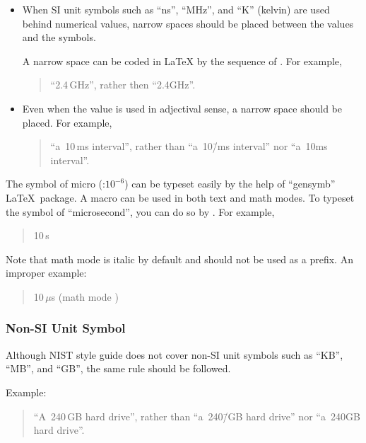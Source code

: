 \begin{itemize}
\item When SI unit symbols such as ``ns'', ``MHz'', and ``K'' (kelvin)
are used behind numerical values, narrow spaces should be placed between
the values and the symbols.

A narrow space can be coded in \LaTeX{} by the sequence of \qco{\\,}.
For example,
\begin{quote}
  ``2.4\,GHz'', rather then ``2.4GHz''.
\end{quote}

\item Even when the value is used in adjectival sense, a narrow space
  should be placed.
  For example,
\begin{quote}
  ``a~10\,ms interval'', rather than ``a~10\=/ms interval'' nor
  ``a~10ms interval''.
\end{quote}
\end{itemize}

The symbol of micro (\micro :$10^{-6}$) can be typeset easily by
the help of ``gensymb'' \LaTeX\ package.
A macro \qco{\\micro} can be used in both text and math modes.
To typeset the symbol of ``microsecond'', you can do
so by .
For example,
\begin{quote}
  10\,\micro s
\end{quote}

Note that math mode \qco{\\mu} is italic by default and should not
be used as a prefix.
An improper example:
\begin{quote}
  10\,$\mu $s (math mode \qco{\\mu})
\end{quote}

\subsubsection{Non-SI Unit Symbol}
\label{sec:app:styleguide:Non-SI Unit Symbol}

Although NIST style guide does not cover non-SI unit symbols
such as ``KB'', ``MB'', and ``GB'', the same rule should be followed.

Example:

\begin{quote}
  ``A~240\,GB hard drive'', rather than ``a~240\=/GB hard drive''
  nor ``a~240GB hard drive''.
\end{quote}

